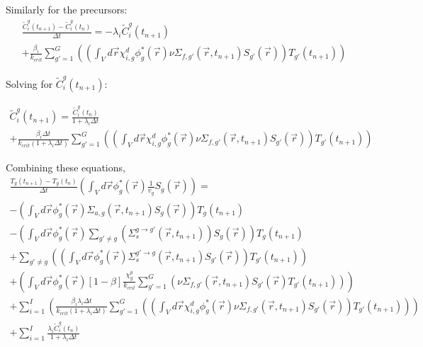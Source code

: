 \documentclass[12pt]{report}
\begin{document}
	Similarly for the precursors:
	\begin{eqnarray}
	\frac{\tilde{C}_i^g(t_{n+1}) - \tilde{C}_i^g(t_{n})}{\Delta t} = -\lambda_i \tilde{C}_i^g(t_{n+1}) \nonumber \\
	 + \frac{\beta_i}{k_{crit}} \sum_{g'=1}^{G}\left( \left( \int_{V} d\vec{r} \chi^d_{i,g} \phi_g^*(\vec{r}) \nu \Sigma_{f,g'}(\vec{r},t_{n+1}) S_{g'}(\vec{r}) \right) T_{g'}(t_{n+1}) \right)
	\end{eqnarray}
	
	Solving for $\tilde{C}_i^g(t_{n+1})$:
	
	\begin{eqnarray}
	\tilde{C}_i^g(t_{n+1}) = \frac{\tilde{C}_i^g(t_{n})}{1+\lambda_i \Delta t}  \nonumber \\
	+ \frac{\beta_i \Delta t}{k_{crit}\left(1+\lambda_i \Delta t\right)} \sum_{g'=1}^{G}\left( \left( \int_{V} d\vec{r} \chi^d_{i,g} \phi_g^*(\vec{r}) \nu \Sigma_{f,g'}(\vec{r},t_{n+1}) S_{g'}(\vec{r}) \right) T_{g'}(t_{n+1}) \right)
	\end{eqnarray}
	
	Combining these equations,
		\begin{eqnarray} 
		\frac{ T_g(t_{n+1}) - T_g(t_{n})}{\Delta t} \left( \int_{V} d\vec{r} \phi_g^*(\vec{r}) \frac{1}{v_g}  S_g(\vec{r}) \right) = \nonumber \\
		- \left( \int_{V} d\vec{r} \phi_g^*(\vec{r}) \Sigma_{a,g}(\vec{r},t_{n+1})  S_g(\vec{r}) \right) T_g(t_{n+1}) \nonumber \\
		- \left( \int_{V} d\vec{r} \phi_g^*(\vec{r}) \sum_{g'\neq g} \left( \Sigma_{s}^{g\rightarrow g'}(\vec{r},t_{n+1}) \right)  S_g(\vec{r}) \right) T_g(t_{n+1}) \nonumber \\
		+ \sum_{g'\neq g} \left( \left( \int_{V}  d\vec{r} \phi_g^*(\vec{r})  \Sigma_{s}^{g'\rightarrow g} (\vec{r},t_{n+1})  S_{g'}(\vec{r}) \right) T_{g'}(t_{n+1}) 
		\right) \nonumber \\
		+ \left( \int_{V} d\vec{r} \phi_g^*(\vec{r}) \left[ 1- \beta \right] \frac{\chi_g^p}{k_{crit}} \sum_{g'=1}^{G} \left( \nu \Sigma_{f,g'}(\vec{r},t_{n+1}) S_{g'}(\vec{r}) T_{g'}(t_{n+1}) \right) \right) \nonumber \\
		+ \sum_{i=1}^{I} \left( \frac{\beta_i \lambda_i \Delta t}{k_{crit}\left(1+\lambda_i \Delta t\right)} \sum_{g'=1}^{G}\left( \left( \int_{V} d\vec{r} \chi^d_{i,g} \phi_g^*(\vec{r}) \nu \Sigma_{f,g'}(\vec{r},t_{n+1}) S_{g'}(\vec{r}) \right) T_{g'}(t_{n+1}) \right) \right) \nonumber \\
		+ \sum_{i=1}^{I} \frac{\lambda_i \tilde{C}_i^g(t_{n})}{1+\lambda_i \Delta t} \nonumber
		\end{eqnarray}
		
\end{document}
